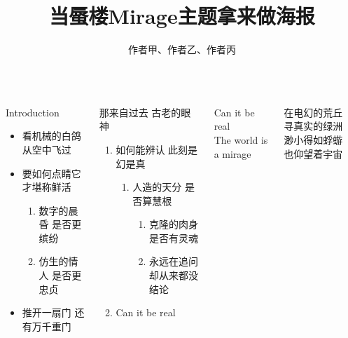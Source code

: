 \documentclass[linespread=1.4,t]{ctexbeamer}
\title{当蜃楼Mirage主题拿来做海报}
\author{作者甲、作者乙、作者丙}
\begin{document}
\begin{frame}

\begin{columns}[T]
\begin{block}{Introduction}

\begin{itemize}
    \item 看机械的白鸽\faDove{} 从空中飞过 
    \item 要如何点睛\faEye[regular] 它才堪称鲜活

\begin{enumerate}
    \item 数字的晨昏\faCloudSun{} 是否更缤纷\faCloudMoon
    \item 仿生的情人\faGrinHearts{} 是否更忠贞\faGrin*[regular]
\end{enumerate}

    \item 推开一扇门\faDoorOpen{} 还有万千重门\faDoorClosed{\small\faDoorClosed}{\footnotesize\faDoorClosed}{\scriptsize\faDoorClosed}{\tiny\faDoorClosed}
\end{itemize}

\end{block}

\begin{block}{那来自过去 古老的眼神}
    \begin{enumerate}
        \item 如何能辨认 此刻是幻是真
        \begin{enumerate}
	        \item 人造的天分 是否算慧根
	        \begin{enumerate}
		        \item 克隆的肉身 是否有灵魂
		        \item 永远在追问 却从来都没结论
	        \end{enumerate}
        \end{enumerate}
        \item \alert{Can it be real}
    \end{enumerate}
\end{block}

\begin{pullquote}
    Can it be real\\
    The world is a mirage
\end{pullquote}

\bigskip
    
\renewcommand{\MiragePullquoteOpen}{\hskip-.2\ccwd『}
\begin{pullquote}
在电幻的荒丘　寻真实的绿洲\\
渺小得如蜉蝣　也仰望着宇宙
\end{pullquote}


\end{columns}
\end{frame}
\end{document}
